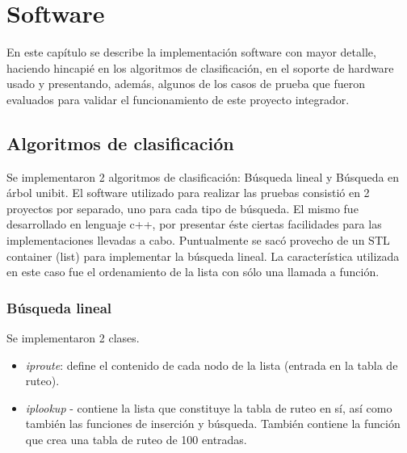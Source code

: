 \chapter{Software}

En este capítulo se describe la implementación software con mayor detalle, haciendo hincapié en los algoritmos de clasificación, en el soporte de hardware usado y presentando, además, algunos de los casos de prueba que fueron evaluados para validar el funcionamiento de este proyecto integrador.


\section{Algoritmos de clasificación}


Se implementaron 2 algoritmos de clasificación: Búsqueda lineal y Búsqueda en árbol unibit. El software utilizado para realizar las pruebas consistió en 2 proyectos por separado, uno para cada tipo de búsqueda. El mismo fue desarrollado en lenguaje c++, por presentar éste ciertas facilidades para las implementaciones llevadas a cabo. Puntualmente se sacó provecho de un STL container (list) para implementar la búsqueda lineal. La característica utilizada en este caso fue el ordenamiento de la lista con sólo una llamada a función.

\subsection {Búsqueda lineal}

Se implementaron 2 clases. 

\begin{itemize}
	\item \textit{iproute}: define el contenido de cada nodo de la lista (entrada en la tabla de ruteo).
	\item \textit{iplookup} -  contiene la lista que constituye la tabla de ruteo en sí, así como también las funciones de inserción y búsqueda. También contiene la función que crea una tabla de ruteo de 100 entradas.
\end{itemize}

